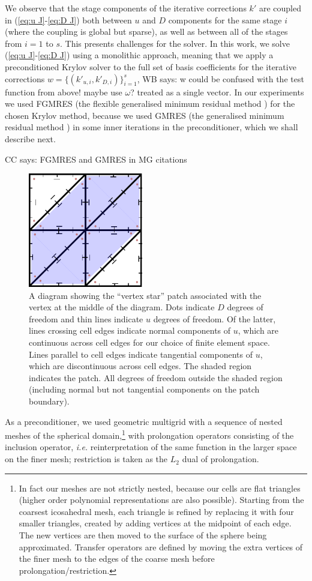 \documentclass[a4paper, 12pt]{article}
\newcommand{\werner}[1]{{\color{magenta}WB says: #1}}
\newcommand{\colin}[1]{{\color{blue}CC says: #1}}
\begin{document}
We observe that the stage components of the iterative corrections $k'$
are coupled in (\ref{eq:u J}-\ref{eq:D J}) both between $u$ and $D$
components for the same stage $i$ (where the coupling is global but
sparse), as well as between all of the stages from $i=1$ to $s$. This
presents challenges for the solver. In this work, we solve (\ref{eq:u
  J}-\ref{eq:D J}) using a monolithic approach, meaning that we apply
a preconditioned Krylov solver to the full set of basis coefficients
for the iterative corrections $w=\{(k'_{u,i}, k'_{D,i})\}_{i=1}^s$,
\werner{w could be confused with the test function from above! maybe use $\omega$?}
treated as a single vector. In our experiments we used FGMRES (the
flexible generalised minimum residual method \citep{saad1993flexible})
for the chosen Krylov method, because we used GMRES (the generalised
minimum residual method \citep{saad1986gmres}) in some inner
iterations in the preconditioner, which we shall describe next.

\colin{FGMRES and GMRES in MG citations}

\begin{figure}
  \center
  \includegraphics[width=5cm]{Images/patch}
  \caption{\label{fig:patch} A diagram showing the ``vertex
    star'' patch associated with the vertex at the middle of the
    diagram. Dots indicate $D$ degrees of freedom and thin lines
    indicate $u$ degrees of freedom. Of the latter, lines crossing
    cell edges indicate normal components of $u$, which are continuous
    across cell edges for our choice of finite element space.  Lines
    parallel to cell edges indicate tangential components of $u$,
    which are discontinuous across cell edges.  The shaded region
    indicates the patch.  All degrees of freedom outside the shaded
    region (including normal but not tangential components on the
    patch boundary).
  }
 \end{figure}

As a preconditioner, we used geometric multigrid with a sequence of
nested meshes of the spherical domain,\footnote{In fact our meshes are
not strictly nested, because our cells are flat triangles (higher
order polynomial representations are also possible). Starting from the
coarsest icosahedral mesh, each triangle is refined by replacing it
with four smaller triangles, created by adding vertices at the
midpoint of each edge. The new vertices are then moved to the surface
of the sphere being approximated. Transfer operators are defined by
moving the extra vertices of the finer mesh to the edges of the coarse
mesh before prolongation/restriction.} with prolongation operators
consisting of the inclusion operator, \emph{i.e.} reinterpretation of
the same function in the larger space on the finer mesh; restriction
is taken as the $L_2$ dual of prolongation.
\end{document}
